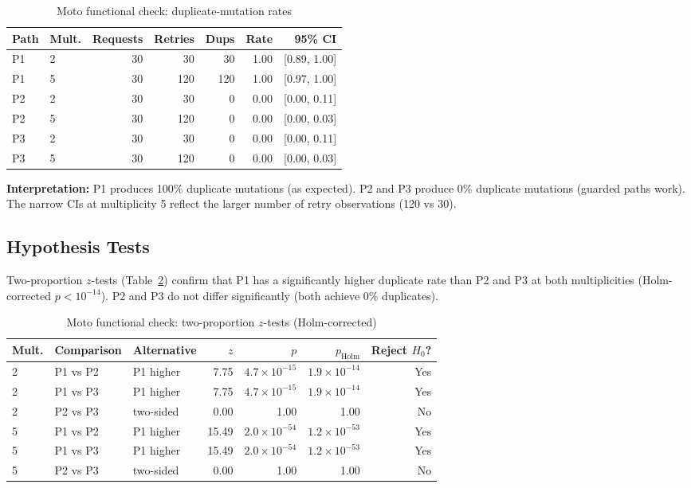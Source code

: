 \begin{table}[h]
\centering
\caption{Moto functional check: duplicate-mutation rates}
\label{tab:moto_dup_rates}
\begin{tabular}{llrrrrr}
\hline
\textbf{Path} & \textbf{Mult.} & \textbf{Requests} & \textbf{Retries} & \textbf{Dups} & \textbf{Rate} & \textbf{95\% CI} \\
\hline
P1 & 2 & 30 & 30 & 30 & 1.00 & [0.89, 1.00] \\
P1 & 5 & 30 & 120 & 120 & 1.00 & [0.97, 1.00] \\
P2 & 2 & 30 & 30 & 0 & 0.00 & [0.00, 0.11] \\
P2 & 5 & 30 & 120 & 0 & 0.00 & [0.00, 0.03] \\
P3 & 2 & 30 & 30 & 0 & 0.00 & [0.00, 0.11] \\
P3 & 5 & 30 & 120 & 0 & 0.00 & [0.00, 0.03] \\
\hline
\end{tabular}
\end{table}

\textbf{Interpretation:} P1 produces 100\% duplicate mutations (as expected). P2 and P3 produce 0\% duplicate mutations (guarded paths work). The narrow CIs at multiplicity 5 reflect the larger number of retry observations (120 vs 30).

\subsection{Hypothesis Tests}

Two-proportion $z$-tests (Table~\ref{tab:moto_z_tests}) confirm that P1 has a significantly higher duplicate rate than P2 and P3 at both multiplicities (Holm-corrected $p < 10^{-14}$). P2 and P3 do not differ significantly (both achieve 0\% duplicates).

\begin{table}[h]
\centering
\caption{Moto functional check: two-proportion $z$-tests (Holm-corrected)}
\label{tab:moto_z_tests}
\begin{tabular}{lllrrrr}
\hline
\textbf{Mult.} & \textbf{Comparison} & \textbf{Alternative} & \textbf{$z$} & \textbf{$p$} & \textbf{$p_{\text{Holm}}$} & \textbf{Reject $H_0$?} \\
\hline
2 & P1 vs P2 & P1 higher & 7.75 & $4.7 \times 10^{-15}$ & $1.9 \times 10^{-14}$ & Yes \\
2 & P1 vs P3 & P1 higher & 7.75 & $4.7 \times 10^{-15}$ & $1.9 \times 10^{-14}$ & Yes \\
2 & P2 vs P3 & two-sided & 0.00 & 1.00 & 1.00 & No \\
5 & P1 vs P2 & P1 higher & 15.49 & $2.0 \times 10^{-54}$ & $1.2 \times 10^{-53}$ & Yes \\
5 & P1 vs P3 & P1 higher & 15.49 & $2.0 \times 10^{-54}$ & $1.2 \times 10^{-53}$ & Yes \\
5 & P2 vs P3 & two-sided & 0.00 & 1.00 & 1.00 & No \\
\hline
\end{tabular}
\end{table}

